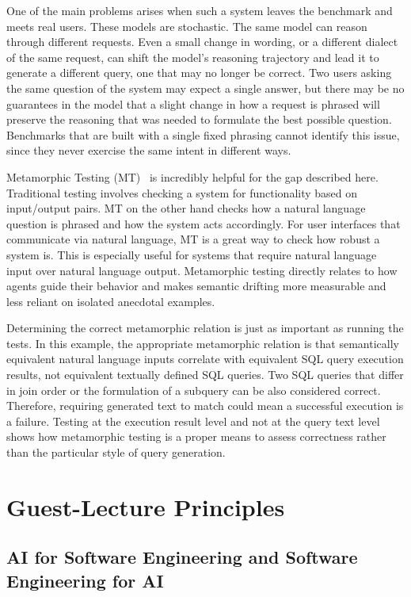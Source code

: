 \documentclass[11pt]{article}
\begin{document}
One of the main problems arises when such a system leaves the benchmark and meets real users. These models are stochastic. The same model can reason through different requests. Even a small change in wording, or a different dialect of the same request, can shift the model's reasoning trajectory and lead it to generate a different query, one that may no longer be correct. Two users asking the same question of the system may expect a single answer, but there may be no guarantees in the model that a slight change in how a request is phrased will preserve the reasoning that was needed to formulate the best possible question. Benchmarks that are built with a single fixed phrasing cannot identify this issue, since they never exercise the same intent in different ways.

Metamorphic Testing (MT)~\citep{de2026metamorphic} is incredibly helpful for the gap described here. Traditional testing involves checking a system for functionality based on input/output pairs. MT on the other hand checks how a natural language question is phrased and how the system acts accordingly. For user interfaces that communicate via natural language, MT is a great way to check how robust a system is. This is especially useful for systems that require natural language input over natural language output. Metamorphic testing directly relates to how agents guide their behavior and makes semantic drifting more measurable and less reliant on isolated anecdotal examples.

Determining the correct metamorphic relation is just as important as running the tests. In this example, the appropriate metamorphic relation is that semantically equivalent natural language inputs correlate with equivalent SQL query execution results, not equivalent textually defined SQL queries. Two SQL queries that differ in join order or the formulation of a subquery can be also considered correct. Therefore, requiring generated text to match could mean a successful execution is a failure. Testing at the execution result level and not at the query text level shows how metamorphic testing is a proper means to assess correctness rather than the particular style of query generation.

\section{Guest-Lecture Principles}

\subsection{AI for Software Engineering and Software Engineering for AI}
\end{document}
